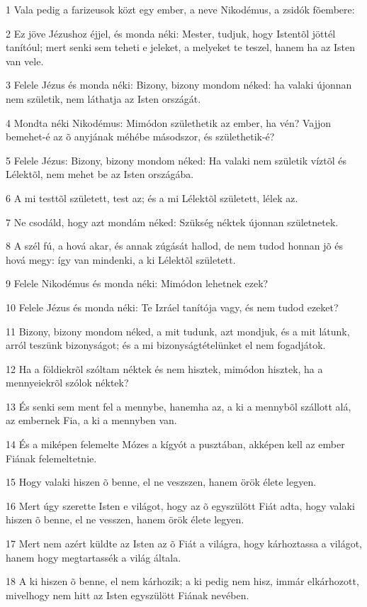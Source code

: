 \par 1 Vala pedig a farizeusok közt egy ember, a neve Nikodémus, a zsidók fõembere:
\par 2 Ez jöve Jézushoz éjjel, és monda néki: Mester, tudjuk, hogy Istentõl jöttél tanítóul; mert senki sem teheti e jeleket, a melyeket te teszel, hanem ha az Isten van  vele.
\par 3 Felele Jézus és monda néki: Bizony, bizony mondom néked: ha valaki újonnan nem születik, nem láthatja az Isten országát.
\par 4 Mondta néki Nikodémus: Mimódon születhetik az ember, ha vén? Vajjon bemehet-é az õ anyjának méhébe másodszor, és születhetik-é?
\par 5 Felele Jézus: Bizony, bizony mondom néked: Ha valaki nem születik víztõl és Lélektõl, nem mehet be az Isten országába.
\par 6 A mi testtõl született, test az; és a mi Lélektõl született, lélek az.
\par 7 Ne csodáld, hogy azt mondám néked: Szükség néktek újonnan születnetek.
\par 8 A szél fú, a hová akar, és annak zúgását hallod, de nem tudod honnan jõ és hová megy: így van mindenki, a ki Lélektõl született.
\par 9 Felele Nikodémus és monda néki: Mimódon lehetnek ezek?
\par 10 Felele Jézus és monda néki: Te Izráel tanítója vagy, és nem tudod ezeket?
\par 11 Bizony, bizony mondom néked, a mit tudunk, azt mondjuk, és a mit látunk, arról teszünk bizonyságot; és a mi bizonyságtételünket el nem fogadjátok.
\par 12 Ha a földiekrõl szóltam néktek és nem hisztek, mimódon hisztek, ha a mennyeiekrõl szólok néktek?
\par 13 És senki sem ment fel a mennybe, hanemha az, a ki a mennybõl szállott alá, az embernek Fia, a ki a mennyben van.
\par 14 És a miképen felemelte Mózes a kígyót a pusztában, akképen kell az ember Fiának  felemeltetnie.
\par 15 Hogy valaki hiszen õ benne, el ne veszszen, hanem örök élete legyen.
\par 16 Mert úgy szerette Isten e világot, hogy az õ egyszülött Fiát adta, hogy valaki hiszen õ benne, el ne vesszen, hanem örök élete legyen.
\par 17 Mert nem azért küldte az Isten az õ Fiát a világra, hogy kárhoztassa a világot, hanem hogy megtartassék a világ általa.
\par 18 A ki hiszen õ benne, el nem kárhozik; a ki pedig nem hisz, immár elkárhozott, mivelhogy nem hitt az Isten egyszülött Fiának nevében.
